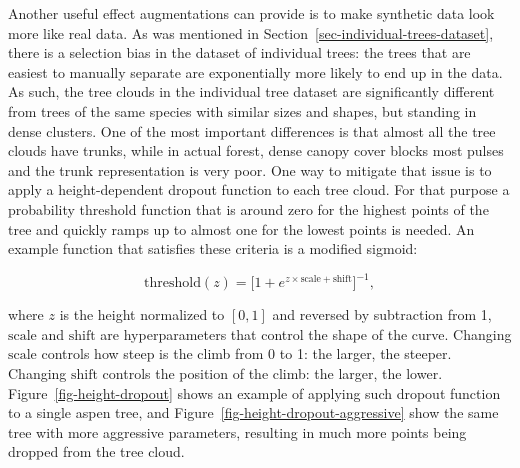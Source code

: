 Another useful effect augmentations can provide is to make synthetic data look more like real data.
As was mentioned in Section~\ref{sec-individual-trees-dataset}, there is a selection bias in the dataset of individual trees: the trees that are easiest to manually separate are exponentially more likely to end up in the data.
As such, the tree clouds in the individual tree dataset are significantly different from trees of the same species with similar sizes and shapes, but standing in dense clusters.
One of the most important differences is that almost all the tree clouds have trunks, while in actual forest, dense canopy cover blocks most pulses and the trunk representation is very poor.
One way to mitigate that issue is to apply a height-dependent dropout function to each tree cloud.
For that purpose a probability threshold function that is around zero for the highest points of the tree and quickly ramps up to almost one for the lowest points is needed.
An example function that satisfies these criteria is a modified sigmoid:

$$
\text{threshold}(z) = \big[1 + e^{z \times \text{scale} + \text{shift}}\big]^{-1},
$$

where $z$ is the height normalized to $[0, 1]$ and reversed by subtraction from 1, $\text{scale}$ and $\text{shift}$ are hyperparameters that control the shape of the curve.
Changing $\text{scale}$ controls how steep is the climb from 0 to 1: the larger, the steeper.
Changing $\text{shift}$ controls the position of the climb: the larger, the lower.
Figure~\ref{fig-height-dropout} shows an example of applying such dropout function to a single aspen tree, and Figure~\ref{fig-height-dropout-aggressive} show the same tree with more aggressive parameters, resulting in much more points being dropped from the tree cloud.


